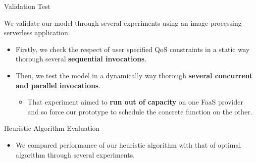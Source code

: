 \documentclass[13.5pt]{beamer}
\newcommand{\B}[1]{\textcolor{TorVergataColor}{\textbf{#1}}}
\begin{document}
\begin{frame}{Validation Test}
	
\begin{block}{}
	\centering
	We validate our model through several experiments using an image-processing serverless application.
\end{block}
	\vspace{\baselineskip}
\begin{itemize}
	\item Firstly, we check the respect of user specified QoS constraints in a static way thorough several \B{sequential invocations}.
	\vspace{\baselineskip}
	\item Then, we test the model in a dynamically way thorough \B{several concurrent and parallel invocations}. 
	\begin{itemize}
	\item That experiment aimed to \B{run out of capacity} on one FaaS provider and so force our prototype to schedule the concrete function on the other.
	\end{itemize}
\end{itemize}

\end{frame}
\begin{frame}{Heuristic Algorithm Evaluation}
	
\begin{itemize}
	\item We compared performance of our heuristic algorithm with that of optimal algorithm through several experiments.
\end{itemize}
	
	\begin{figure}
		\\
	\end{figure}

\end{frame}
\end{document}
